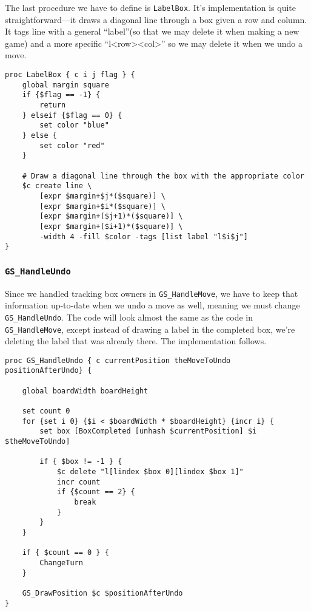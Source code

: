 \documentclass{article}
\begin{document}
The last procedure we have to define is \texttt{LabelBox}. It's implementation is quite straightforward---it draws a diagonal line through a box given a row and column. It tags line with a general ``label''(so that we may delete it when making a new game) and a more specific ``l<row><col>'' so we may delete it when we undo a move.

\begin{verbatim}
proc LabelBox { c i j flag } {
    global margin square
    if {$flag == -1} {
        return
    } elseif {$flag == 0} {
        set color "blue"
    } else {
        set color "red"
    }
    
    # Draw a diagonal line through the box with the appropriate color
    $c create line \
        [expr $margin+$j*($square)] \
        [expr $margin+$i*($square)] \
        [expr $margin+($j+1)*($square)] \
        [expr $margin+($i+1)*($square)] \
        -width 4 -fill $color -tags [list label "l$i$j"]
}
\end{verbatim}

\subsubsection{\texttt{GS\_HandleUndo}}

Since we handled tracking box owners in \texttt{GS\_HandleMove}, we have to keep that information up-to-date when we undo a move as well, meaning we must change \texttt{GS\_HandleUndo}. The code will look almost the same as the code in \texttt{GS\_HandleMove}, except instead of drawing a label in the completed box, we're deleting the label that was already there. The implementation follows.

\begin{verbatim}
proc GS_HandleUndo { c currentPosition theMoveToUndo positionAfterUndo} {

    global boardWidth boardHeight

    set count 0
    for {set i 0} {$i < $boardWidth * $boardHeight} {incr i} {
        set box [BoxCompleted [unhash $currentPosition] $i $theMoveToUndo]

        if { $box != -1 } {
            $c delete "l[lindex $box 0][lindex $box 1]"
            incr count
            if {$count == 2} {
                break
            }
        }
    }

    if { $count == 0 } {
        ChangeTurn
    }

    GS_DrawPosition $c $positionAfterUndo
}
\end{verbatim}
\end{document}
